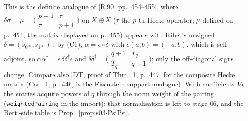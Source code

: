 \begin{proposition}
This is the definite analogue of [Ri90, pp.~454--455], where $\delta\sigma=\mu=\big(\begin{smallmatrix}p+1&\tau\\\tau&p+1\end{smallmatrix}\big)$ on $X\oplus X$ ($\tau$ the $p$-th Hecke operator; $\mu$ defined on p.~454, the matrix displayed on p.~455) appears with Ribet's unsigned
$\delta=(s_{0*},s_{1*})$ \stcited{} : by (C1),
$\alpha=\epsilon\circ\delta$ with $\epsilon(a,b)=(-a,b)$, which is self-adjoint, so $\alpha\alpha^\dagger=\epsilon\,\delta\delta^\dagger\epsilon$ and
$\delta\delta^\dagger=\big(\begin{smallmatrix}q+1&T_q\\T_q&q+1\end{smallmatrix}\big)$; only the off-diagonal signs change. Compare also [DT, proof of Thm.~1, p.~447] for the composite Hecke matrix
\stcited{}  (Cor.~1, p.~446, is the Eisenstein-support analogue). With coefficients $V_k$ the entries acquire
powers of $q$ through the norm weight of the pairing (\texttt{weightedPairing} in the import); that normalisation is left to stage 06, and the Betti-side
table is Prop.~\ref{prop:s03-PsiPsi}.
\end{proposition}
